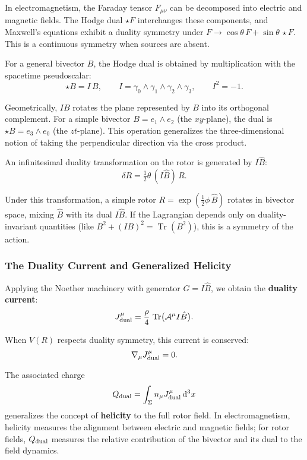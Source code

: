 \documentclass[11pt,a4paper]{article}
\numberwithin{equation}{section}
\theoremstyle{plain}
\theoremstyle{definition}
\theoremstyle{remark}
\DeclareMathOperator{\Tr}{Tr}
\newcommand{\dd}{\mathrm{d}}
\begin{document}
In electromagnetism, the Faraday tensor $F_{\mu\nu}$ can be decomposed into electric and magnetic fields. The Hodge dual $\star F$ interchanges these components, and Maxwell's equations exhibit a duality symmetry under $F \to \cos\theta\, F + \sin\theta\, \star F$. This is a continuous symmetry when sources are absent.

For a general bivector $B$, the Hodge dual is obtained by multiplication with the spacetime pseudoscalar:
\begin{equation}
\star B = I\,B, \qquad I = \gamma_0\wedge\gamma_1\wedge\gamma_2\wedge\gamma_3, \qquad I^2 = -1.
\end{equation}

Geometrically, $IB$ rotates the plane represented by $B$ into its orthogonal complement. For a simple bivector $B = e_1\wedge e_2$ (the $xy$-plane), the dual is $\star B = e_3\wedge e_0$ (the $zt$-plane). This operation generalizes the three-dimensional notion of taking the perpendicular direction via the cross product.

An infinitesimal duality transformation on the rotor is generated by $I\hat{B}$:
\begin{equation}
\delta R = \tfrac{1}{2}\theta\, (I\hat{B})\,R.
\end{equation}

Under this transformation, a simple rotor $R = \exp(\frac{1}{2}\phi\,\hat{B})$ rotates in bivector space, mixing $\hat{B}$ with its dual $I\hat{B}$. If the Lagrangian depends only on duality-invariant quantities (like $B^2 + (IB)^2 = \Tr(B^2)$), this is a symmetry of the action.

\subsubsection{The Duality Current and Generalized Helicity}

Applying the Noether machinery with generator $G = I\hat{B}$, we obtain the \textbf{duality current}:
\begin{equation}
J^\mu_{\rm dual} = \frac{\rho}{4}\,\Tr\!\big(\mathcal{A}^\mu I\hat{B}\big).
\label{eq:duality}
\end{equation}

When $V(R)$ respects duality symmetry, this current is conserved:
\begin{equation}
\nabla_\mu J^\mu_{\rm dual} = 0.
\end{equation}

The associated charge
\begin{equation}
Q_{\rm dual} = \int_\Sigma n_\mu J^\mu_{\rm dual}\, \dd^3x
\end{equation}
generalizes the concept of \textbf{helicity} to the full rotor field. In electromagnetism, helicity measures the alignment between electric and magnetic fields; for rotor fields, $Q_{\rm dual}$ measures the relative contribution of the bivector and its dual to the field dynamics.
\end{document}
